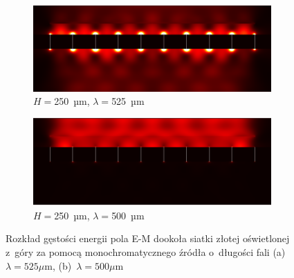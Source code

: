 \begin{figure}[htb]
	\begin{subfigure}{0.45\textwidth}
		\includegraphics[width=\textwidth]{images/thz/con_src_l525.png}
		\caption{$H=$250~µm, $\lambda=$525~µm}
		\label{fig:consrcl525}
	\end{subfigure}
	\begin{subfigure}{0.45\textwidth}
		\includegraphics[width=\textwidth]{images/thz/con_src_l500.png}
		\caption{$H=$250~µm, $\lambda=$500~µm}
		\label{fig:consrcl500}
	\end{subfigure}
	\caption{Rozkład gęstości energii pola E-M dookoła siatki złotej oświetlonej z~góry za pomocą monochromatycznego źródła o~długości fali (a)~$\lambda=525\mu$m, (b)~$\lambda=500\mu$m} 
\end{figure}

